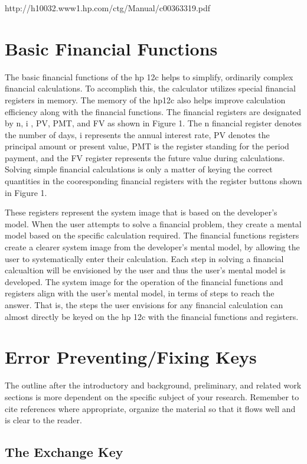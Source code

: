 \documentclass{article}
\begin{document}
http://h10032.www1.hp.com/ctg/Manual/c00363319.pdf

\section{Basic Financial Functions}

The basic financial functions of the hp 12c helps to simplify, ordinarily complex financial calculations. To accomplish this, the calculator utilizes special financial registers in memory. The memory of the hp12c also helps improve calculation efficiency along with the financial functions. The financial registers are designated by n, i , PV, PMT, and FV as shown in Figure 1. The n financial register denotes the number of days, i represents the annual interest rate, PV denotes the principal amount or present value, PMT is the register standing for the period payment, and the FV register represents the future value during calculations. Solving simple financial calculations is only a matter of keying the correct quantities in the cooresponding financial registers with the register buttons shown in Figure 1.

These registers represent the system image that is based on the developer's model. When the user attempts to solve a financial problem, they create a mental model based on the specific calculation required. The financial functions registers create a clearer system image from the developer's mental model, by allowing the user to systematically enter their calculation. Each step in solving a financial calcualtion will be envisioned by the user and thus the user's mental model is developed. The system image for the operation of the financial functions and registers align with the user's mental model, in terms of steps to reach the answer. That is, the steps the user envisions for any financial calculation can almost directly be keyed on the hp 12c with the financial functions and registers.

\section{Error Preventing/Fixing Keys}

The outline after the introductory and background, preliminary, and related work sections is more dependent on the specific subject of your research.  Remember to cite references where appropriate, organize the material so that it flows well and is clear to the reader.

\subsection{The Exchange Key}
\end{document}

